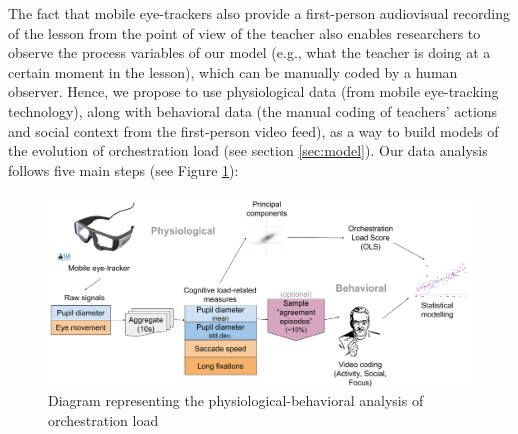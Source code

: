 \documentclass[10pt,journal,compsoc]{IEEEtran}
\begin{document}
The fact that mobile eye-trackers also provide a first-person audiovisual recording of the lesson from the point of view of the teacher also enables researchers to observe the process variables of our model (e.g., what the teacher is doing at a certain moment in the lesson), which can be manually coded by a human observer. Hence, we propose to use physiological data (from mobile eye-tracking technology), along with behavioral data (the manual coding of teachers' actions and social context from the first-person video feed), as a way to build models of the evolution of orchestration load (see section \ref{sec:model}). Our data analysis follows five main steps (see Figure \ref{fig:analysis}):

\begin{figure}[!t]
\centering
\includegraphics[width=\linewidth]{img/AnalysisMethodBase.png}
\caption{Diagram representing the physiological-behavioral analysis of orchestration load}
\label{fig:analysis}
\end{figure}
\end{document}
